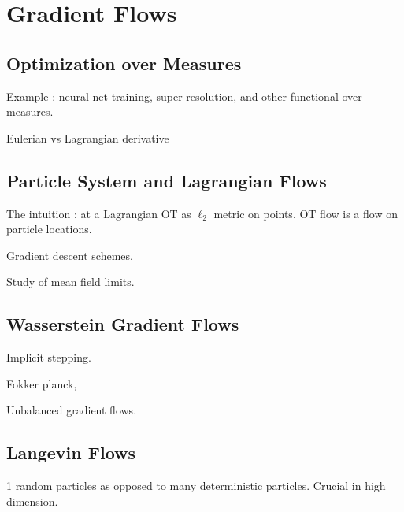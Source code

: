 
\section{Gradient Flows}




\subsection{Optimization over Measures}

Example : neural net training, super-resolution, and other functional over measures.

Eulerian vs Lagrangian derivative 
   

\subsection{Particle System and Lagrangian Flows}

The intuition : at a Lagrangian OT as $\ell_2$ metric on points. OT flow is a flow on particle locations. 

Gradient descent schemes.

Study of mean field limits.

\subsection{Wasserstein Gradient Flows}

Implicit stepping. 

Fokker planck, 

Unbalanced gradient flows. 


\subsection{Langevin Flows}

1 random particles as opposed to many deterministic particles. Crucial in high dimension. 